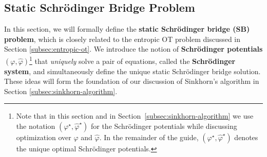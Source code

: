 \documentclass{article}
\newcommand{\boldtext}[1]{\textbf{\textcolor{MyGreen}{#1}}}
\begin{document}
\subsection{Static Schrödinger Bridge Problem}
\label{subsec:static-sbp}
In this section, we will formally define the \boldtext{static Schrödinger bridge (SB) problem}, which is closely related to the entropic OT problem discussed in Section \ref{subsec:entropic-ot}. We introduce the notion of \boldtext{Schrödinger potentials} $(\varphi, \hat{\varphi})$\footnote{Note that in this section and in Section~\ref{subsec:sinkhorn-algorithm} we use the notation $(\varphi^\star,\hat{\varphi}^\star)$ for the Schrödinger potentials while discussing optimization over $\varphi$ and $\hat{\varphi}$. In the remainder of the guide, $(\varphi^\star,\hat{\varphi}^\star)$ denotes the unique optimal Schrödinger potentials.} that \textit{uniquely} solve a pair of equations, called the \textbf{Schrödinger system}, and simultaneously define the unique static Schrödinger bridge solution. These ideas will form the foundation of our discussion of Sinkhorn's algorithm in Section \ref{subsec:sinkhorn-algorithm}.
\end{document}
